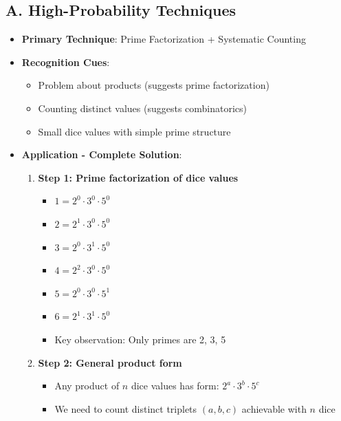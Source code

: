 \documentclass[12pt]{article}
\begin{document}
\begin{techniquesbox}
\subsection*{A. High-Probability Techniques}
\begin{itemize}[leftmargin=*]
    \item \textbf{Primary Technique}: Prime Factorization + Systematic Counting
    \item \textbf{Recognition Cues}: 
    \begin{itemize}
        \item Problem about products (suggests prime factorization)
        \item Counting distinct values (suggests combinatorics)
        \item Small dice values with simple prime structure
    \end{itemize}
    \item \textbf{Application - Complete Solution}: 
    \begin{enumerate}
        \item \textbf{Step 1: Prime factorization of dice values}
        \begin{itemize}
            \item $1 = 2^0 \cdot 3^0 \cdot 5^0$
            \item $2 = 2^1 \cdot 3^0 \cdot 5^0$
            \item $3 = 2^0 \cdot 3^1 \cdot 5^0$
            \item $4 = 2^2 \cdot 3^0 \cdot 5^0$
            \item $5 = 2^0 \cdot 3^0 \cdot 5^1$
            \item $6 = 2^1 \cdot 3^1 \cdot 5^0$
            \item Key observation: Only primes are 2, 3, 5
        \end{itemize}
        
        \item \textbf{Step 2: General product form}
        \begin{itemize}
            \item Any product of $n$ dice values has form: $2^a \cdot 3^b \cdot 5^c$
            \item We need to count distinct triplets $(a, b, c)$ achievable with $n$ dice
        \end{itemize}
        

\end{enumerate}
\end{itemize}
\end{techniquesbox}
\end{document}
